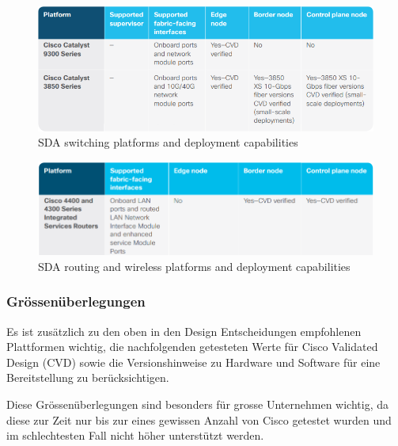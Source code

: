 \begin{figure}[H]
	\centering
	\includegraphics[width=1\linewidth]{img/Analyse/CVD-SDAswitchingplatformsanddeploymentcapabilities-1-2-5}
	\caption{SDA switching platforms and deployment capabilities \cite{sda-designguide-sept2018}}
	\label{fig:SDA switching platforms and deployment capabilities}
\end{figure}

\begin{figure}[H]
	\centering
	\includegraphics[width=1\linewidth]{img/Analyse/CVD-SDAroutingandwirelessplatformsanddeploymentcapabilities-1-2-5}
	\caption{SDA routing and wireless platforms and deployment capabilities \cite{sda-designguide-sept2018}}
	\label{fig:SDA routing and wireless platforms and deployment capabilities}
\end{figure}

\subsubsection{Grössenüberlegungen}
Es ist zusätzlich zu den oben in den Design Entscheidungen empfohlenen Plattformen wichtig, die nachfolgenden getesteten Werte für Cisco Validated Design (CVD) sowie die Versionshinweise zu Hardware und Software für eine Bereitstellung zu berücksichtigen.

Diese Grössenüberlegungen sind besonders für grosse Unternehmen wichtig, da diese zur Zeit nur bis zur eines gewissen Anzahl von Cisco getestet wurden und im schlechtesten Fall nicht höher unterstützt werden.


